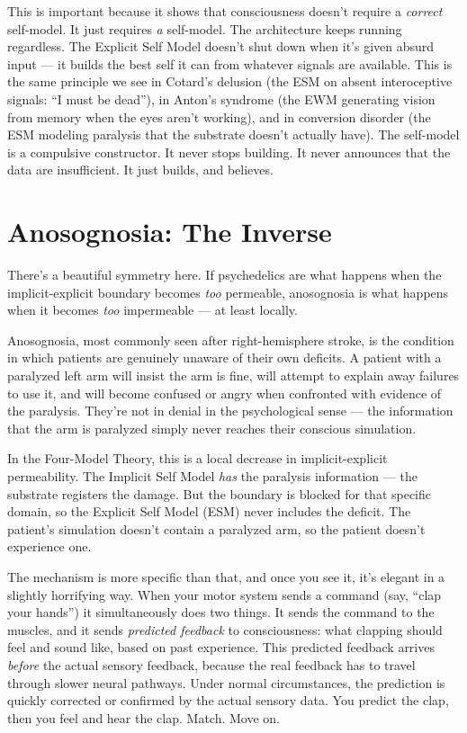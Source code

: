 \documentclass[11pt, twoside, openright]{book}
\begin{document}
This is important because it shows that consciousness doesn't require a \textit{correct} self-model. It just requires \textit{a} self-model. The architecture keeps running regardless. The Explicit Self Model doesn't shut down when it's given absurd input --- it builds the best self it can from whatever signals are available. This is the same principle we see in Cotard's delusion (the ESM on absent interoceptive signals: ``I must be dead''), in Anton's syndrome (the EWM generating vision from memory when the eyes aren't working), and in conversion disorder (the ESM modeling paralysis that the substrate doesn't actually have). The self-model is a compulsive constructor. It never stops building. It never announces that the data are insufficient. It just builds, and believes.

\section*{Anosognosia: The Inverse}

There's a beautiful symmetry here. If psychedelics are what happens when the implicit-explicit boundary becomes \textit{too} permeable, anosognosia is what happens when it becomes \textit{too} impermeable --- at least locally.

Anosognosia, most commonly seen after right-hemisphere stroke, is the condition in which patients are genuinely unaware of their own deficits. A patient with a paralyzed left arm will insist the arm is fine, will attempt to explain away failures to use it, and will become confused or angry when confronted with evidence of the paralysis. They're not in denial in the psychological sense --- the information that the arm is paralyzed simply never reaches their conscious simulation.

In the Four-Model Theory, this is a local decrease in implicit-explicit permeability. The Implicit Self Model \textit{has} the paralysis information --- the substrate registers the damage. But the boundary is blocked for that specific domain, so the Explicit Self Model (ESM) never includes the deficit. The patient's simulation doesn't contain a paralyzed arm, so the patient doesn't experience one.

The mechanism is more specific than that, and once you see it, it's elegant in a slightly horrifying way. When your motor system sends a command (say, ``clap your hands'') it simultaneously does two things. It sends the command to the muscles, and it sends \textit{predicted feedback} to consciousness: what clapping should feel and sound like, based on past experience. This predicted feedback arrives \textit{before} the actual sensory feedback, because the real feedback has to travel through slower neural pathways. Under normal circumstances, the prediction is quickly corrected or confirmed by the actual sensory data. You predict the clap, then you feel and hear the clap. Match. Move on.
\end{document}
